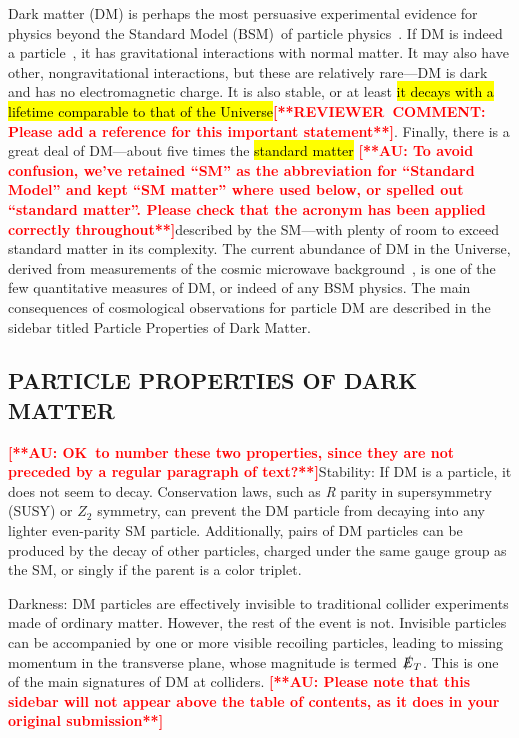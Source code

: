 \documentclass{ar-1col}
\newcommand{\MET}{\ensuremath{\slashed{E}_T}\xspace}
\begin{document}
Dark matter (DM) is perhaps the most persuasive experimental
evidence for physics beyond the Standard Model (BSM)\ of particle
physics~\cite{Bertone:2016nfn}. If DM is indeed a
particle~\cite{Steigman:1979kw}, it has gravitational interactions
with normal matter. It may also have other, nongravitational
interactions, but these are relatively rare---DM is dark
and has no electromagnetic charge. It is also stable, or at least
\hl{it decays with a lifetime comparable to that of the Universe}\textbf{\textcolor{red}{[**REVIEWER\ COMMENT: Please add a reference for this important statement**]}}.
Finally, there is a great deal of DM---about five times the \hl{standard
matter} \textbf{\textcolor{red}{[**AU: To avoid confusion, we've retained ``SM'' as the abbreviation for ``Standard Model'' and kept ``SM matter'' where used below, or spelled out ``standard matter''. Please check that the acronym has been applied correctly throughout**]}}described by the SM---with plenty of room to exceed standard matter in its complexity. The
current abundance of DM in the Universe, derived from
measurements of the cosmic microwave
background~\cite{Ade:2015xua}, is one of the few quantitative
measures of DM, or indeed of any BSM physics. The main consequences of cosmological observations for
particle DM are described in the sidebar titled Particle Properties of Dark Matter.

\begin{textbox}
\section{PARTICLE PROPERTIES OF DARK MATTER}

\noindent \textbf{\textcolor{red}{[**AU: OK\ to number these two properties, since they are not preceded by a regular paragraph of text?**]}}Stability: If DM is a particle, it does not seem to decay.
Conservation laws, such as \textit{R} parity in supersymmetry (SUSY) or $Z_2$ symmetry, can prevent the DM particle from decaying into any
lighter even-parity SM particle. Additionally, pairs of DM
particles can be produced by the decay of other particles, charged
under the same gauge group as the SM, or singly if the
parent is a color triplet.

Darkness: DM particles are effectively invisible to
traditional collider experiments made of ordinary matter. However,
the rest of the event is not. Invisible particles can be
accompanied by one or more visible recoiling particles, leading to
missing momentum in the transverse plane, whose magnitude is
termed \MET. This is one of the main signatures of DM at
colliders.
\textbf{\textcolor{red}{[**AU: Please note that this sidebar will not appear above the table of contents, as it does in your original submission**]}}\end{textbox}
\end{document}
